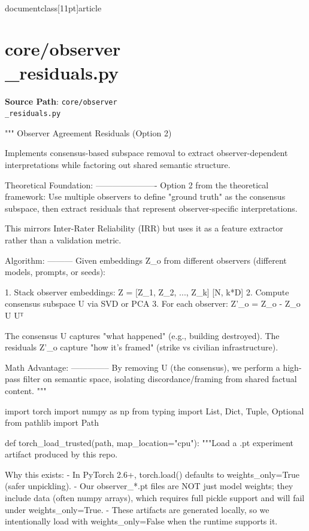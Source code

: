 \\documentclass[11pt]{article}
\begin{document}
\section*{core/observer\\_residuals.py}
\textbf{Source Path}: \texttt{core/observer\\_residuals.py}\par
\bigskip
\begin{CodeBlock}
"""
Observer Agreement Residuals (Option 2)

Implements consensus-based subspace removal to extract observer-dependent
interpretations while factoring out shared semantic structure.

Theoretical Foundation:
----------------------
Option 2 from the theoretical framework: Use multiple observers to define
"ground truth" as the consensus subspace, then extract residuals that
represent observer-specific interpretations.

This mirrors Inter-Rater Reliability (IRR) but uses it as a feature
extractor rather than a validation metric.

Algorithm:
---------
Given embeddings Z_o from different observers (different models, prompts, or seeds):

1. Stack observer embeddings: Z = [Z_1, Z_2, ..., Z_k]  [N, k*D]
2. Compute consensus subspace U via SVD or PCA
3. For each observer: Z'_o = Z_o - Z_o U Uᵀ

The consensus U captures "what happened" (e.g., building destroyed).
The residuals Z'_o capture "how it's framed" (strike vs civilian infrastructure).

Math Advantage:
--------------
By removing U (the consensus), we perform a high-pass filter on semantic space,
isolating discordance/framing from shared factual content.
"""

import torch
import numpy as np
from typing import List, Dict, Tuple, Optional
from pathlib import Path


def torch_load_trusted(path, map_location="cpu"):
    """Load a .pt experiment artifact produced by this repo.

    Why this exists:
      - In PyTorch 2.6+, torch.load() defaults to weights_only=True (safer unpickling).
      - Our observer_*.pt files are NOT just model weights; they include data (often numpy arrays),
        which requires full pickle support and will fail under weights_only=True.
      - These artifacts are generated locally, so we intentionally load with weights_only=False
        when the runtime supports it.


\end{CodeBlock}
\end{document}
